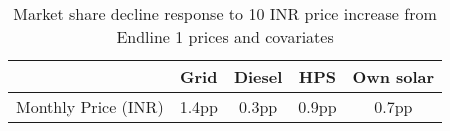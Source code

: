 \begin{table}[htbp]\centering
\caption{Market share decline response to 10 INR price increase from Endline 1 prices and covariates}
\begin{tabular}{l*{4}{c}}
\toprule
                &     Grid&   Diesel&      HPS&Own solar\\
\midrule
Monthly Price (INR)&    1.4pp&    0.3pp&    0.9pp&    0.7pp\\

\bottomrule
\end{tabular}
\end{table}